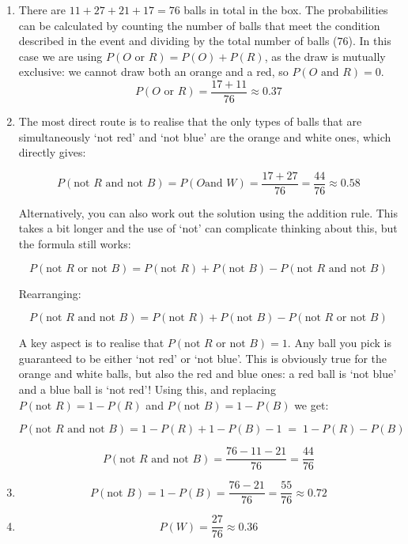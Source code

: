 \documentclass[a4paper, leqno, 12pt]{article} %
\newenvironment{top_enumerate}{
\begin{enumerate}
  \setlength{\itemsep}{2em}
  \setlength{\topsep}{-0pt}
  \setlength{\partopsep}{-0pt}
}{\end{enumerate}}
\begin{document}
\begin{top_enumerate}
\setcounter{equation}{0}  %
\begin{enumerate}
	\setlength{\topsep}{-0pt}
	\setlength{\partopsep}{-0pt}
	\setlength{\itemsep}{10pt}
			\item There are ${11} + {27} + {21} + {17} = {76}$ balls in total in the box. The probabilities can be calculated by counting the number of balls that meet the condition described in the event and dividing by the total number of balls (${76}$). In this case we are using $P(O \textrm{ or } R) = P(O) + P(R)$, as the draw is mutually exclusive: we cannot draw both an orange and a red, so $P(O \textrm{ and } R) = 0$.
	\[
	P(O \textrm{ or } R) = \frac{{17} + {11}}{76} \approx {0.37}
	\]
	 \quad \textbf{}
		\item The most direct route is to realise that the only types of balls that are simultaneously `not red' and `not blue' are the orange and white ones, which directly gives:
	
	\[
	P(\textrm{not } R \textrm{ and not } B) =  P( O \textrm{and } W) = \frac{{17}+{27}}{{76}} = \frac{{44}}{{76}} \approx {0.58}
	\]
	
	Alternatively, you can also work out the solution using the addition rule. This takes a bit longer and the use of `not' can complicate thinking about this, but the formula still works:
	
	\[
	P(\textrm{not } R \textrm{ or not } B) = P(\textrm{not } R) + P(\textrm{not } B) - P(\textrm{not } R \textrm{ and not } B)
	\]
	
	Rearranging:
	
	\[
	P(\textrm{not } R \textrm{ and not } B) = P(\textrm{not } R) + P(\textrm{not } B) - P(\textrm{not } R \textrm{ or not } B)
	\]
	
	A key aspect is to realise that $P(\textrm{not } R \textrm{ or not } B) = 1$. Any ball you pick is guaranteed to be either `not red' or `not blue'. This is obviously true for the orange and white balls, but also the red and blue ones: a red ball is `not blue' and a blue ball is `not red'! Using this, and replacing $P(\textrm{not } R) = 1 - P(R)$ and $P(\textrm{not } B) = 1 - P(B)$ we get:
	
	\[
	P(\textrm{not } R \textrm{ and not } B) = 1 - P(R) + 1 - P(B) - 1 \; = \; 1 - P(R) - P(B)
	\]
	
	\[
	P(\textrm{not } R \textrm{ and not } B) = \frac{{76} - {11} - {21}}{{76}} = \frac{{44}}{{76}}
	\]
	 \quad \textbf{}
		\item \[
	P(\textrm{not } B) = 1 - P(B) = \frac{{76} - {21}}{{76}} = \frac{{55}}{{76}} \approx {0.72}
	\]
	 \quad \textbf{}
		\item \[
	P(W) = \frac{27}{76} \approx {0.36}
	\]
	 \quad \textbf{}
\end{enumerate}\newpage


\end{top_enumerate}
\end{document}
